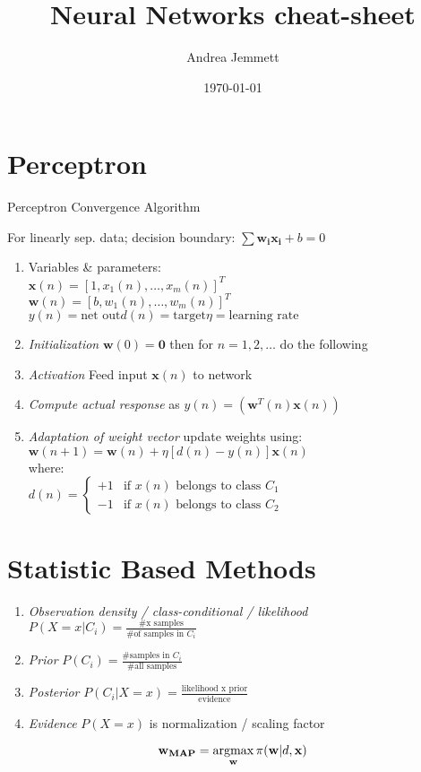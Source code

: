 \documentclass[11pt, twocolumn]{article}
\title{Neural Networks cheat-sheet}
\author{Andrea Jemmett}
\date{\today}
\newcommand{\argmax}{\operatornamewithlimits{argmax}}
\newcommand{\sign}{}
\begin{document}
\maketitle

\section{Perceptron}
Perceptron Convergence Algorithm

\footnotesize
For linearly sep. data; decision boundary: $\sum \mathbf{w_i x_i} + b = 0$
\begin{enumerate}
	\item Variables \& parameters:\\
	$\mathbf{x}(n) = \left[1, x_1(n), \dots, x_m(n)\right]^T$\\
	$\mathbf{w}(n) = \left[b, w_1(n), \dots, w_m(n)\right]^T$\\
	$y(n) = \mbox{net out}$\qquad$d(n) = \mbox{target}$\qquad$\eta = \mbox{learning rate}$
	\item \emph{Initialization} $\mathbf{w}(0) = \mathbf{0}$ then for $n = 1, 2, \dots$ do the following
	\item \emph{Activation} Feed input $\mathbf{x}(n)$ to network
	\item \emph{Compute actual response} as $y(n) = \sign(\mathbf{w}^T(n)\mathbf{x}(n))$
	\item \emph{Adaptation of weight vector} update weights using:\\
	$\mathbf{w}(n+1) = \mathbf{w}(n)+\eta[d(n)-y(n)]\mathbf{x}(n)$\\
	where:\\
	$d(n) = \begin{cases} +1 & \mbox{if }x(n)\mbox{ belongs to class }C_1 \\ -1 & \mbox{if }x(n)\mbox{ belongs to class }C_2 \end{cases}$
\end{enumerate}
\normalsize

\section{Statistic Based Methods}
\begin{enumerate}
	\item \emph{Observation density / class-conditional / likelihood}\\ $P(X=x|C_i) = \frac{\mbox{\# x samples}}{\mbox{\# of samples in }C_i}$
	\item \emph{Prior} $P(C_i) = \frac{\mbox{\# samples in }C_i}{\mbox{\# all samples}}$
	\item \emph{Posterior} $P(C_i|X=x) = \frac{\mbox{likelihood x prior}}{\mbox{evidence}}$
	\item \emph{Evidence} $P(X=x)$ is normalization / scaling factor
\end{enumerate}
$$\mathbf{w_{MAP}} = \argmax_{\mathbf{w}} \pi(\mathbf{w}|d,\mathbf{x})$$
\end{document}
